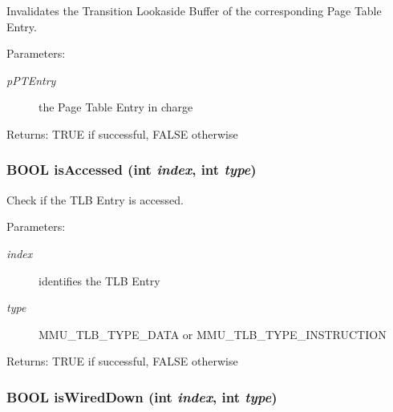 Invalidates the Transition Lookaside Buffer of the corresponding Page Table Entry. \begin{Desc}
\item[Parameters:]
\begin{description}
\item[{\em pPTEntry}]the Page Table Entry in charge \end{description}
\end{Desc}
\begin{Desc}
\item[Returns:]TRUE if successful, FALSE otherwise \end{Desc}
\hypertarget{group___v_m_m___t_l_b_gec5186e1f24ab3de57765267723dfba6}{
\subsubsection[{isAccessed}]{\setlength{\rightskip}{0pt plus 5cm}BOOL isAccessed (int {\em index}, \/  int {\em type})}}
\label{group___v_m_m___t_l_b_gec5186e1f24ab3de57765267723dfba6}


Check if the TLB Entry is accessed. \begin{Desc}
\item[Parameters:]
\begin{description}
\item[{\em index}]identifies the TLB Entry \item[{\em type}]MMU\_\-TLB\_\-TYPE\_\-DATA or MMU\_\-TLB\_\-TYPE\_\-INSTRUCTION \end{description}
\end{Desc}
\begin{Desc}
\item[Returns:]TRUE if successful, FALSE otherwise \end{Desc}
\hypertarget{group___v_m_m___t_l_b_g394e8e5ef0f91baf7ee2e6ffbb41a632}{
\subsubsection[{isWiredDown}]{\setlength{\rightskip}{0pt plus 5cm}BOOL isWiredDown (int {\em index}, \/  int {\em type})}}
\label{group___v_m_m___t_l_b_g394e8e5ef0f91baf7ee2e6ffbb41a632}


